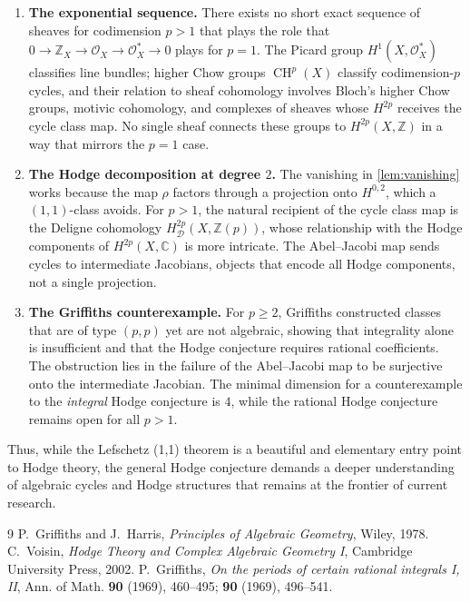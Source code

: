 \documentclass[12pt]{article}
\theoremstyle{plain}
\theoremstyle{definition}
\begin{document}
\begin{enumerate}
    \item \textbf{The exponential sequence.} 
    There exists no short exact sequence of sheaves for codimension $p>1$ that plays the role that $0 \to \mathbb Z_X \to \mathcal O_X \to \mathcal O_X^* \to 0$ plays for $p=1$. 
    The Picard group $H^1(X,\mathcal O_X^*)$ classifies line bundles; higher Chow groups $\operatorname{CH}^p(X)$ classify codimension-$p$ cycles, and their relation to sheaf cohomology involves Bloch's higher Chow groups, motivic cohomology, and complexes of sheaves whose $H^{2p}$ receives the cycle class map. 
    No single sheaf connects these groups to $H^{2p}(X,\mathbb Z)$ in a way that mirrors the $p=1$ case.

    \item \textbf{The Hodge decomposition at degree $2$.} 
    The vanishing in \cref{lem:vanishing} works because the map $\rho$ factors through a projection onto $H^{0,2}$, which a $(1,1)$-class avoids. 
    For $p>1$, the natural recipient of the cycle class map is the Deligne cohomology $H_{\mathcal D}^{2p}(X,\mathbb Z(p))$, whose relationship with the Hodge components of $H^{2p}(X,\mathbb C)$ is more intricate. 
    The Abel--Jacobi map sends cycles to intermediate Jacobians, objects that encode all Hodge components, not a single projection.

    \item \textbf{The Griffiths counterexample.} 
    For $p \geq 2$, Griffiths \cite{griffiths} constructed classes that are of type $(p,p)$ yet are not algebraic, showing that integrality alone is insufficient and that the Hodge conjecture requires rational coefficients. 
    The obstruction lies in the failure of the Abel--Jacobi map to be surjective onto the intermediate Jacobian. 
    The minimal dimension for a counterexample to the \emph{integral} Hodge conjecture is $4$, while the rational Hodge conjecture remains open for all $p>1$.
\end{enumerate}

Thus, while the Lefschetz (1,1) theorem is a beautiful and elementary entry point to Hodge theory, the general Hodge conjecture demands a deeper understanding of algebraic cycles and Hodge structures that remains at the frontier of current research.

\begin{thebibliography}{9}
P.~Griffiths and J.~Harris, \textit{Principles of Algebraic Geometry}, Wiley, 1978.
C.~Voisin, \textit{Hodge Theory and Complex Algebraic Geometry I}, Cambridge University Press, 2002.
P.~Griffiths, \textit{On the periods of certain rational integrals I, II}, Ann. of Math. \textbf{90} (1969), 460--495; \textbf{90} (1969), 496--541.
\end{thebibliography}
\end{document}

